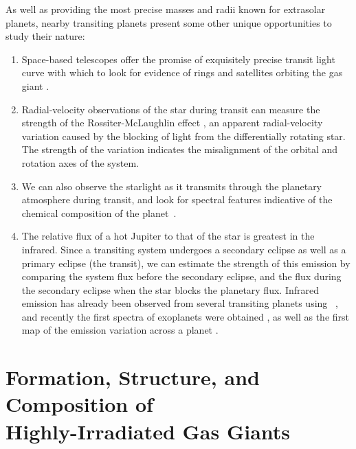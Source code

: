 As well as providing the most precise masses and radii known for extrasolar planets, nearby transiting planets present some other unique opportunities to study their nature:
\begin{enumerate}
\item
Space-based telescopes offer the promise of exquisitely precise transit light curve with which to look for evidence of rings and satellites orbiting the gas giant \citep[see, e.g.,][]{Brown_Charbonneau_Gilliland:apj:2001a}.
\item
Radial-velocity observations of the star during transit can measure the strength of the Rossiter-McLaughlin effect \citep{McLaughlin:apj:1924a,Rossiter:apj:1924a}, an apparent radial-velocity variation caused by the blocking of light from the differentially rotating star.
The strength of the variation indicates the misalignment of the orbital and rotation axes of the system.
\item
We can also observe the starlight as it transmits through the planetary atmosphere during transit, and look for spectral features indicative of the chemical composition of the planet~\citep{Charbonneau_Brown_Noyes:apj:2002a, Vidal-Madjar_Lecavelier-des-Etangs_Desert:nat:2003a, Vidal-Madjar_Desert_Lecavelier-des-Etangs:apjl:2004a, Deming_Brown_Charbonneau:apj:2005a, Barman:apjl:2007a}.
\item
The relative flux of a hot Jupiter to that of the star is greatest in the infrared.
Since a transiting system undergoes a secondary eclipse as well as a primary eclipse (the transit), we can estimate the strength of this emission by comparing the system flux before the secondary eclipse, and the flux during the secondary eclipse when the star blocks the planetary flux.
Infrared emission has already been observed from several transiting planets using \spi\ \citep[see, e.g.,][]{Charbonneau_Allen_Megeath:apj:2005a, Deming_Seager_Richardson:nat:2005a}, and recently the first spectra of exoplanets were obtained \citep{Richardson_Deming_Horning:Nature:2007a, Swain_Bouwman_Akeson:preprint:2007a, Grillmair_Charbonneau_Burrows:apjl:2007a}, as well as the first map of the emission variation across a planet \citep{Knutson_Charbonneau_Allen:nat:2007a}.
\end{enumerate}

\section[Formation, Structure, and Composition of Highly-Irradiated Gas Giants]
{Formation, Structure, and Composition of \\ Highly-Irradiated Gas Giants}
\label{cha:intro:sec:form}

